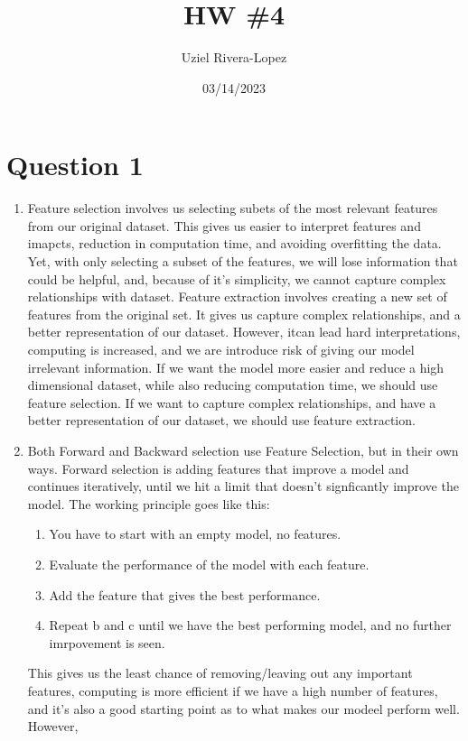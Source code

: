 \documentclass{article}
\title{HW \#4}
\author{
    Uziel Rivera-Lopez
}
\date{03/14/2023}
\begin{document}
\maketitle

\section*{Question 1}
\begin{enumerate} [label=(\alph*)]
    \item Feature selection involves us selecting subets of the most relevant features from our original dataset.
    This gives us easier to interpret features and imapcts, reduction in computation time, and avoiding overfitting the data. Yet, with only selecting a 
    subset of the features, we will lose information that could be helpful, and, because of it's simplicity, we cannot capture complex relationships with dataset. Feature extraction involves creating a new set of features from the original set. It gives us capture complex relationships, and a better representation of our dataset.
    However, itcan lead hard interpretations, computing is increased, and we are introduce risk of giving our model irrelevant information.    
    If we want the model more easier and reduce a high dimensional dataset, while also reducing computation time, we should use feature selection. If we want to capture complex relationships, and have a better representation of our dataset, we should use feature extraction.
    \item Both Forward and Backward selection use Feature Selection, but in their own ways. Forward selection is 
    adding features that improve a model and continues iteratively, until we hit a limit that doesn't signficantly improve the model.
    The working principle goes like this:
    \begin{enumerate}
        \item You have to start with an empty model, no features.
        \item Evaluate the performance of the model with each feature.
        \item Add the feature that gives the best performance.
        \item Repeat b and c until we have the best performing model, and no further imrpovement is seen.
    \end{enumerate}
    This gives us the least chance of removing/leaving out any important features, computing is more efficient if we have a high number of 
    features, and it's also a good starting point as to what makes our modeel perform well. However, 

\end{enumerate}
\end{document}
